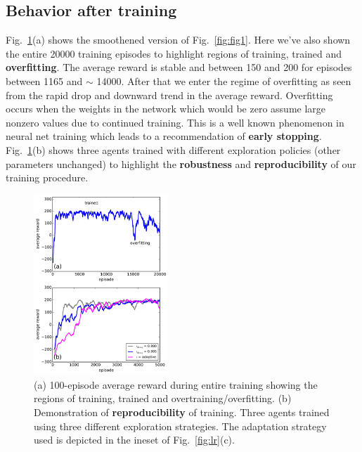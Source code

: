 \documentclass[conference]{IEEEtran}
\begin{document}
\subsection{Behavior after training}
Fig.~\ref{fig:fig2}(a) shows the smoothened version of Fig.~\ref{fig:fig1}. Here we've also shown the entire 20000 training episodes to highlight regions of training, trained and {\bf overfitting}. The average reward is stable and between 150 and 200 for episodes between  1165 and $\sim$ 14000. After that we enter the regime of overfitting as seen from the rapid drop and downward trend in the average reward. Overfitting occurs when the weights in the network which would be zero assume large nonzero values due to continued training. This is a well known phenomenon in neural net training which leads to a recommendation of {\bf early stopping}. Fig.~\ref{fig:fig2}(b) shows three agents trained with different exploration policies (other parameters unchanged) to highlight the {\bf robustness} and {\bf reproducibility} of our training procedure.
\begin{figure}[tbp]
    \centering
    \includegraphics[width=0.45\textwidth]{./figures/fig2.pdf}
    \caption{(a) 100-episode average reward during entire training showing the regions of training, trained and overtraining/overfitting. (b) Demonstration of {\bf reproducibility} of training. Three agents trained using three different exploration strategies. The adaptation strategy used is depicted in the ineset of Fig.~\ref{fig:lr}(c).\label{fig:fig2}}
\end{figure}
\end{document}
